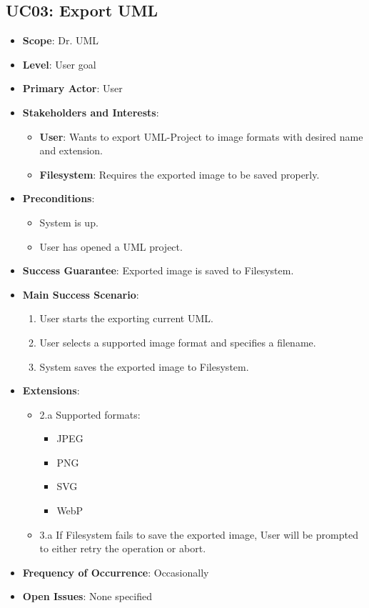 \documentclass[12pt]{article}
\begin{document}
    \subsection{UC03: Export UML}
    \begin{itemize}
        \item \textbf{Scope}: Dr. UML
        \item \textbf{Level}: User goal
        \item \textbf{Primary Actor}: User
        \item \textbf{Stakeholders and Interests}:
        \begin{itemize}
            \item \textbf{User}: Wants to export UML-Project to image formats with desired name and extension.
            \item \textbf{Filesystem}: Requires the exported image to be saved properly.
        \end{itemize}
        \item \textbf{Preconditions}:
        \begin{itemize}
            \item System is up.
            \item User has opened a UML project.
        \end{itemize}
        \item \textbf{Success Guarantee}: Exported image is saved to Filesystem.
        \item \textbf{Main Success Scenario}:
        \begin{enumerate}
            \item User starts the exporting current UML.
            \item User selects a supported image format and specifies a filename.
            \item System saves the exported image to Filesystem.
        \end{enumerate}
        \item \textbf{Extensions}:
        \begin{itemize}
            \item 2.a Supported formats:
            \begin{itemize}
                \item JPEG
                \item PNG
                \item SVG
                \item WebP
            \end{itemize}
            \item 3.a If Filesystem fails to save the exported image, User will be prompted to either retry the operation or abort.
        \end{itemize}
        \item \textbf{Frequency of Occurrence}: Occasionally
        \item \textbf{Open Issues}: None specified
    \end{itemize}
\end{document}
